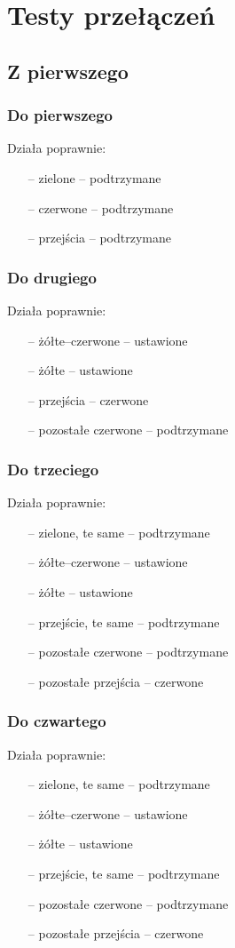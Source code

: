\documentclass[a4paper, 12pt, titlepage]{article}
\begin{document}
	\section{Testy przełączeń}
		\subsection{Z pierwszego}
			\subsubsection{Do pierwszego}
				Działa poprawnie:
				\begin{itemize}
					\item[--] zielone -- podtrzymane
					\item[--] czerwone -- podtrzymane
					\item[--] przejścia -- podtrzymane
				\end{itemize}
			\subsubsection{Do drugiego}
				Działa poprawnie:
				\begin{itemize}
					\item[--] żółte--czerwone -- ustawione
					\item[--] żółte -- ustawione
					\item[--] przejścia -- czerwone
					\item[--] pozostałe czerwone -- podtrzymane
				\end{itemize}
			\subsubsection{Do trzeciego}
				Działa poprawnie:
				\begin{itemize}
					\item[--] zielone, te same -- podtrzymane
					\item[--] żółte--czerwone -- ustawione
					\item[--] żółte -- ustawione
					\item[--] przejście, te same -- podtrzymane
					\item[--] pozostałe czerwone -- podtrzymane
					\item[--] pozostałe przejścia -- czerwone
				\end{itemize}
			\subsubsection{Do czwartego}
				Działa poprawnie:
				\begin{itemize}
					\item[--] zielone, te same -- podtrzymane
					\item[--] żółte--czerwone -- ustawione
					\item[--] żółte -- ustawione
					\item[--] przejście, te same -- podtrzymane
					\item[--] pozostałe czerwone -- podtrzymane
					\item[--] pozostałe przejścia -- czerwone
				\end{itemize}
		\newpage
\end{document}
